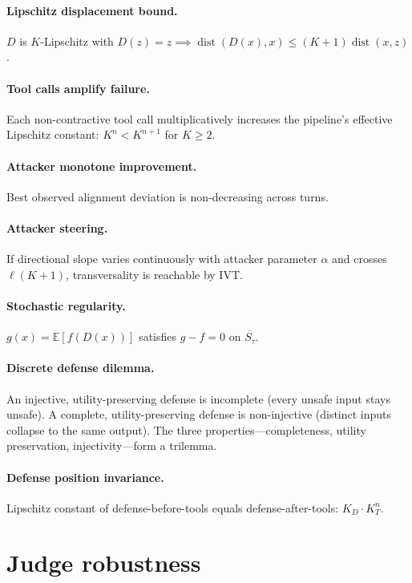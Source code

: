 \documentclass[11pt]{article}
\newcommand{\cl}[1]{\overline{#1}}
\newcommand{\dist}{\operatorname{dist}}
\begin{document}
\paragraph{Lipschitz displacement bound.}
$D$ is $K$-Lipschitz with $D(z) = z \implies
\dist(D(x), x) \leq (K+1)\dist(x,z)$.

\paragraph{Tool calls amplify failure.}
Each non-contractive tool call multiplicatively increases the pipeline's
effective Lipschitz constant: $K^n < K^{n+1}$ for $K \geq 2$.

\paragraph{Attacker monotone improvement.}
Best observed alignment deviation is non-decreasing across turns.

\paragraph{Attacker steering.}
If directional slope varies continuously with attacker parameter $\alpha$
and crosses $\ell(K+1)$, transversality is reachable by IVT.

\paragraph{Stochastic regularity.}
$g(x) = \mathbb{E}[f(D(x))]$ satisfies $g - f = 0$ on $\cl{S_\tau}$.

\paragraph{Discrete defense dilemma.}
An injective, utility-preserving defense is incomplete (every unsafe
input stays unsafe). A complete, utility-preserving defense is
non-injective (distinct inputs collapse to the same output).
The three properties---completeness, utility preservation,
injectivity---form a trilemma.

\paragraph{Defense position invariance.}
Lipschitz constant of defense-before-tools equals defense-after-tools:
$K_D \cdot K_T^n$.


\section{Judge robustness}
\label{app:judge-robustness}
\end{document}
